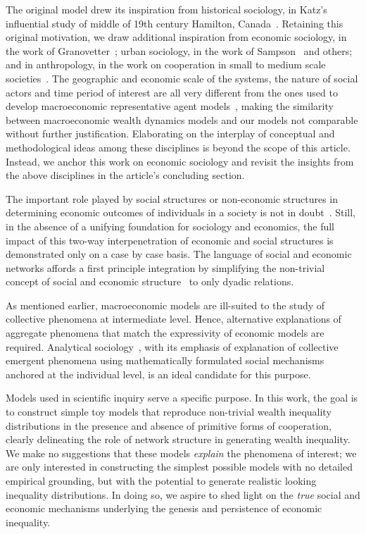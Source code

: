 \documentclass{article}
\begin{document}
The original model drew its inspiration from historical sociology, in Katz's influential study of middle of 19th century Hamilton, Canada~\cite{katz2013people}. Retaining this original motivation, we draw additional inspiration from economic sociology, in the work of Granovetter~\cite{granovetter2005}; urban sociology, in the work of Sampson~\cite{sampson2002} and others; and in anthropology, in the work on cooperation in small to medium scale societies~\cite{avner1994,white2011kinship}. The geographic and economic scale of the systems, the nature of social actors and time period of interest are all very different from the ones used to develop macroeconomic representative agent models~\cite{benhabib2018}, making the similarity between macroeconomic wealth dynamics models and our models not comparable without further justification. Elaborating on the interplay of conceptual and methodological ideas among these disciplines is beyond the scope of this article. Instead, we anchor this work on economic sociology and revisit the insights from the above disciplines in the article's concluding section. 

The important role played by social structures or non-economic structures in determining economic outcomes of individuals in a society is not in doubt~\cite{granovetter2005,jackson_rev2017}. Still, in the absence of a unifying foundation for sociology and economics, the full impact of this two-way interpenetration of economic and social structures is demonstrated only on a case by case basis. The language of social and economic networks affords a first principle integration by simplifying the non-trivial concept of social and economic structure~\cite{martin_lee} to only dyadic relations. 

As mentioned earlier, macroeconomic models are ill-suited to the study of collective phenomena at intermediate level. Hence, alternative explanations of aggregate phenomena that match the expressivity of economic models are required. Analytical sociology~\cite{ch1as_hdbk}, with its emphasis of explanation of collective emergent phenomena using mathematically formulated social mechanisms~\cite{ch2as_hdbk,ch11as_hdbk} anchored at the individual level, is an ideal candidate for this purpose. 

Models used in scientific inquiry serve a specific purpose. In this work, the goal is to construct simple toy models that reproduce non-trivial wealth inequality distributions in the presence and absence of primitive forms of cooperation, clearly delineating the role of network structure in generating wealth inequality. We make no suggestions that these models \textit{explain} the phenomena of interest; we are only interested in constructing the simplest possible models with no detailed empirical grounding, but with the potential to generate realistic looking inequality distributions. In doing so, we aspire to shed light on the \textit{true} social and economic mechanisms underlying the genesis and persistence of economic inequality. 
\end{document}
